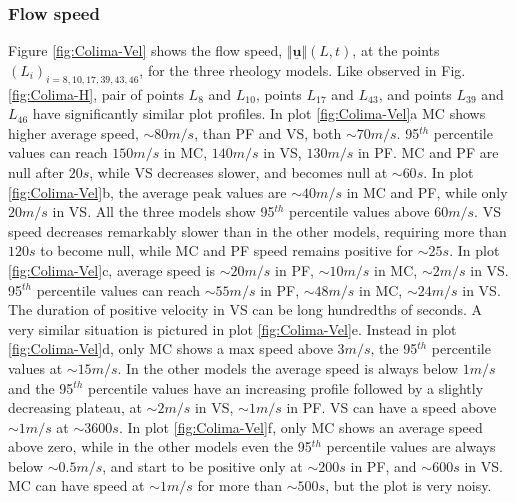 \documentclass{article}
\begin{document}
\subsubsection{Flow speed}
Figure \ref{fig:Colima-Vel} shows the flow speed, $\Vert \underline{\mathbf{u}} \Vert(L,t)$, at the points $(L_i)_{i=8,10,17,39,43,46}$, for the three rheology models. Like observed in Fig.\ref{fig:Colima-H}, pair of points $L_8$ and $L_{10}$, points $L_{17}$ and $L_{43}$, and points $L_{39}$ and $L_{46}$ have significantly similar plot profiles. In plot \ref{fig:Colima-Vel}a MC shows higher average speed, $\sim 80 m/s$, than PF and VS, both $\sim 70 m/s$. 95$^{th}$ percentile values can reach $150 m/s$ in MC, $140 m/s$ in VS, $130 m/s$ in PF. MC and PF are null after $20 s$, while VS decreases slower, and becomes null at $\sim 60 s$. In plot \ref{fig:Colima-Vel}b, the average peak values are $\sim 40 m/s$ in MC and PF, while only $20 m/s$ in VS. All the three models show 95$^{th}$ percentile values above $60 m/s$. VS speed decreases remarkably slower than in the other models, requiring more than $120 s$ to become null, while MC and PF speed remains positive for $\sim 25 s$. In plot \ref{fig:Colima-Vel}c, average speed is $\sim 20 m/s$ in PF, $\sim 10 m/s$ in MC, $\sim 2 m/s$ in VS. 95$^{th}$ percentile values can reach $\sim 55 m/s$ in PF, $\sim 48 m/s$ in MC, $\sim 24 m/s$ in VS. The duration of positive velocity in VS can be long hundredths of seconds. A very similar situation is pictured in plot \ref{fig:Colima-Vel}e. Instead in plot \ref{fig:Colima-Vel}d, only MC shows a max speed above $3 m/s$, the 95$^{th}$ percentile values at $\sim 15 m/s$. In the other models the average speed is always below $1 m/s$ and the 95$^{th}$ percentile values have an increasing profile followed by a slightly decreasing plateau, at $\sim 2 m/s$ in VS, $\sim 1 m/s$ in PF. VS can have a speed above $\sim 1 m/s$ at $\sim 3600 s$. In plot \ref{fig:Colima-Vel}f, only MC shows an average speed above zero, while in the other models even the 95$^{th}$ percentile values are always below $\sim 0.5 m/s$, and start to be positive only at $\sim 200 s$ in PF, and $\sim 600 s$ in VS. MC can have speed at $\sim 1 m/s$ for more than $\sim 500 s$, but the plot is very noisy.
\end{document}
